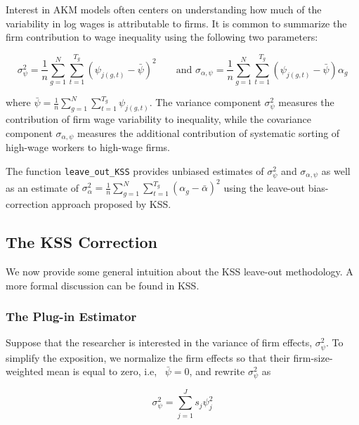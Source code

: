 \documentclass[11pt]{article}
\begin{document}
Interest in AKM models often centers on understanding how much of the
variability in log wages is attributable to firms. It is common to
summarize the firm contribution to wage inequality using the following
two parameters:

\begin{equation}
\sigma_{\psi }^2 =\frac{1}{n}\sum_{g=1}^N \sum_{t=1}^{T_g } {\left(\psi_{j\left(g,t\right)} -\bar{\psi} \right)}^2 \qquad \text{and }\sigma_{\alpha ,\psi } =\frac{1}{n}\sum_{g=1}^N \sum_{t=1}^{T_g } \left(\psi_{j\left(g,t\right)} -\bar{\psi} \right)\alpha_g           
\end{equation}

where
\(\bar{\psi} =\frac{1}{n}\sum_{g=1}^N \sum_{t=1}^{T_g } \psi_{j(g,t)}\).
The variance component \(\sigma_{\psi }^2\) measures the contribution of
firm wage variability to inequality, while the covariance component
\(\sigma_{\alpha ,\psi }\) measures the additional contribution of
systematic sorting of high-wage workers to high-wage firms.

The function \texttt{leave\_out\_KSS} provides unbiased estimates of
\(\sigma_{\psi }^2\) and \(\sigma_{\alpha ,\psi }\) as well as an
estimate of
\(\sigma_{\alpha }^2 =\frac{1}{n}\sum_{g=1}^N \sum_{t=1}^{T_g } {\left(\alpha_g -\bar{\alpha} \right)}^2\)
using the leave-out bias-correction approach proposed by KSS.

\hypertarget{the-kss-correction}{%
\subsection{The KSS Correction}\label{the-kss-correction}}

We now provide some general intuition about the KSS leave-out
methodology. A more formal discussion can be found in KSS.
\hypertarget{the-plug-in-estimator}{%
\subsubsection{The Plug-in Estimator}\label{the-plug-in-estimator}}

Suppose that the researcher is interested in the variance of firm effects,
\(\sigma_{\psi }^2\). To simplify the exposition, we normalize the firm
effects so that their firm-size-weighted mean is equal to zero,
i.e, ~\(\bar{\psi}=0\), and rewrite \(\sigma_{\psi }^2\) as

\begin{equation}
\sigma_{\psi }^2 =\sum_{j=1}^J s_{j}\psi^{2}_{j}
\end{equation}
\end{document}
